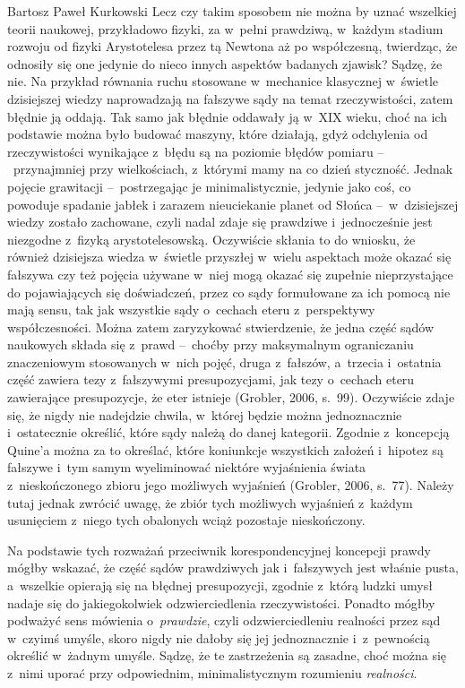 \begin{artplenv}{Bartosz Paweł Kurkowski}
Lecz czy takim sposobem nie można by uznać wszelkiej teorii naukowej, przykładowo fizyki, za w~pełni prawdziwą, w~każdym
stadium rozwoju od fizyki Arystotelesa przez tą Newtona aż po współczesną, twierdząc, że odnosiły się one jedynie do
nieco innych aspektów badanych zjawisk? Sądzę, że nie. Na przykład równania ruchu stosowane w~mechanice
klasycznej w~świetle dzisiejszej wiedzy naprowadzają na fałszywe sądy na temat rzeczywistości, zatem błędnie ją oddają.
Tak samo jak
błędnie oddawały ją w~XIX wieku, choć na ich podstawie można było budować maszyny, które działają, gdyż odchylenia od
rzeczywistości wynikające z~błędu są na poziomie błędów pomiaru --~przynajmniej przy wielkościach, z~którymi mamy na co
dzień styczność. Jednak pojęcie grawitacji --~postrzegając je minimalistycznie, jedynie jako coś, co powoduje spadanie
jabłek\textit{ }i zarazem nieuciekanie planet od Słońca --~w~dzisiejszej wiedzy zostało zachowane, czyli nadal zdaje się
prawdziwe i~jednocześnie jest niezgodne z~fizyką arystotelesowską. Oczywiście skłania to do wniosku, że również
dzisiejsza wiedza w~świetle przyszłej w~wielu aspektach może okazać się fałszywa czy też pojęcia używane w~niej mogą
okazać się zupełnie nieprzystające do pojawiających się doświadczeń, przez co sądy formułowane za ich pomocą nie mają
sensu, tak jak wszystkie sądy o~cechach eteru z~perspektywy współczesności. Można zatem zaryzykować stwierdzenie, że
jedna część sądów naukowych składa się z~prawd --~choćby przy maksymalnym ograniczaniu znaczeniowym stosowanych w~nich
pojęć, druga z~fałszów, a~trzecia i~ostatnia część zawiera tezy z~fałszywymi presupozycjami, jak tezy o~cechach eteru
zawierające presupozycje, że eter istnieje \label{ref:RND5RNmxQdKuz}(Grobler, 2006, s.~99). Oczywiście zdaje się, że
nigdy nie nadejdzie chwila, w~której będzie można jednoznacznie i~ostatecznie określić, które sądy należą do danej
kategorii. Zgodnie z~koncepcją Quine’a można za to określać, które koniunkcje wszystkich założeń i~hipotez są fałszywe
i~tym samym wyeliminować niektóre wyjaśnienia świata z~nieskończonego zbioru jego możliwych wyjaśnień
\label{ref:RND2QpWDqqtYH}(Grobler, 2006, s.~77). Należy tutaj jednak zwrócić uwagę, że zbiór tych możliwych
wyjaśnień z~każdym usunięciem z~niego tych obalonych wciąż pozostaje nieskończony.


Na podstawie tych rozważań przeciwnik korespondencyjnej koncepcji prawdy mógłby wskazać, że część sądów prawdziwych
jak i~fałszywych jest właśnie pusta, a~wszelkie opierają się na błędnej presupozycji, zgodnie z~którą ludzki umysł nadaje
się do jakiegokolwiek odzwierciedlenia rzeczywistości. Ponadto mógłby podważyć sens mówienia o~\textit{prawdzie}, czyli
odzwierciedleniu realności przez sąd w~czyimś umyśle, skoro nigdy nie dałoby się jej jednoznacznie i~z~pewnością
określić w~żadnym umyśle. Sądzę, że te zastrzeżenia są zasadne, choć można się z~nimi uporać przy odpowiednim,
minimalistycznym rozumieniu \textit{realności}.


\end{artplenv}
